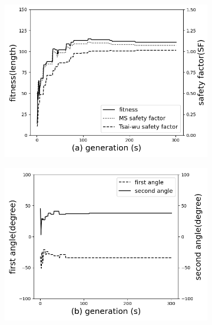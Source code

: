 \begin{figure}[!htb]
	\centering
		\begin{subfigure}[b]{0.8\linewidth}
			\includegraphics[width=\linewidth]{Figures/chapter3/part2/image/two_distinct_angle_fitness_and_sr.png}
		\end{subfigure}

		\begin{subfigure}[b]{0.8\linewidth}
			\includegraphics[width=\linewidth]{Figures/chapter3/part2/image/two_distinct_angle_angle_change.png}
		\end{subfigure}


\end{figure}

